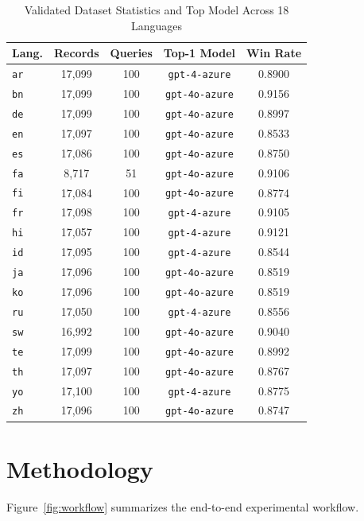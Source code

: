 \documentclass[sigconf]{acmart}
\begin{document}
\begin{table}[t]
\centering
\caption{Validated Dataset Statistics and Top Model Across 18 Languages}
\label{tab:lang_summary}
\scriptsize
\begin{tabular}{lcccc}
\toprule
\textbf{Lang.} & \textbf{Records} & \textbf{Queries} & \textbf{Top-1 Model} & \textbf{Win Rate} \\
\midrule
\texttt{ar} & 17,099 & 100 & \texttt{gpt-4-azure} & 0.8900 \\
\texttt{bn} & 17,099 & 100 & \texttt{gpt-4o-azure} & 0.9156 \\
\texttt{de} & 17,099 & 100 & \texttt{gpt-4o-azure} & 0.8997 \\
\texttt{en} & 17,097 & 100 & \texttt{gpt-4o-azure} & 0.8533 \\
\texttt{es} & 17,086 & 100 & \texttt{gpt-4o-azure} & 0.8750 \\
\texttt{fa} & 8,717  & 51  & \texttt{gpt-4o-azure} & 0.9106 \\
\texttt{fi} & 17,084 & 100 & \texttt{gpt-4o-azure} & 0.8774 \\
\texttt{fr} & 17,098 & 100 & \texttt{gpt-4-azure} & 0.9105 \\
\texttt{hi} & 17,057 & 100 & \texttt{gpt-4-azure} & 0.9121 \\
\texttt{id} & 17,095 & 100 & \texttt{gpt-4-azure} & 0.8544 \\
\texttt{ja} & 17,096 & 100 & \texttt{gpt-4o-azure} & 0.8519 \\
\texttt{ko} & 17,096 & 100 & \texttt{gpt-4o-azure} & 0.8519 \\
\texttt{ru} & 17,050 & 100 & \texttt{gpt-4-azure} & 0.8556 \\
\texttt{sw} & 16,992 & 100 & \texttt{gpt-4o-azure} & 0.9040 \\
\texttt{te} & 17,099 & 100 & \texttt{gpt-4o-azure} & 0.8992 \\
\texttt{th} & 17,097 & 100 & \texttt{gpt-4o-azure} & 0.8767 \\
\texttt{yo} & 17,100 & 100 & \texttt{gpt-4-azure} & 0.8775 \\
\texttt{zh} & 17,096 & 100 & \texttt{gpt-4o-azure} & 0.8747 \\
\bottomrule
\end{tabular}
\end{table}

\section{Methodology}
Figure~\ref{fig:workflow} summarizes the end-to-end experimental workflow.
\end{document}

